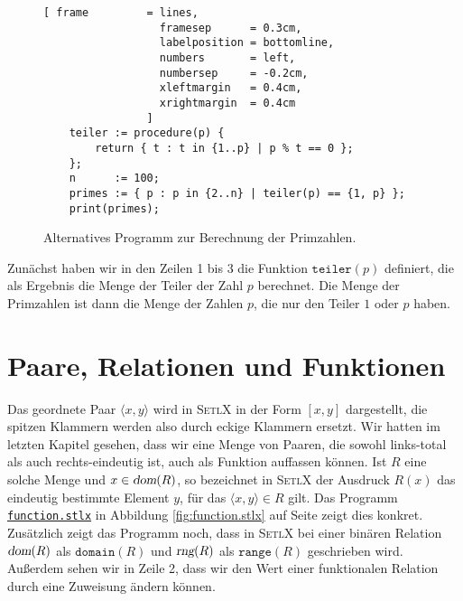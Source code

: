 \begin{figure}[!ht]
  \centering
\begin{Verbatim}[ frame         = lines, 
                  framesep      = 0.3cm, 
                  labelposition = bottomline,
                  numbers       = left,
                  numbersep     = -0.2cm,
                  xleftmargin   = 0.4cm,
                  xrightmargin  = 0.4cm
                ]
    teiler := procedure(p) {
        return { t : t in {1..p} | p % t == 0 };
    };
    n      := 100;
    primes := { p : p in {2..n} | teiler(p) == {1, p} };
    print(primes);
\end{Verbatim} 
\vspace*{-0.3cm}
\caption{Alternatives Programm zur Berechnung der Primzahlen.  \label{fig:primes-slim.stlx}}
\end{figure} %

Zunächst haben wir in den Zeilen 1 bis 3 die Funktion $\texttt{teiler}(p)$ definiert, die
als Ergebnis die Menge der Teiler der Zahl $p$ berechnet.  Die Menge der Primzahlen ist dann die
Menge der Zahlen $p$, die nur den Teiler $1$ oder $p$ haben.


\section{Paare, Relationen und Funktionen}
Das geordnete Paar $\langle x, y \rangle$ wird in \textsc{SetlX} in der Form $[x,y]$
dargestellt, die spitzen Klammern werden also durch eckige Klammern ersetzt.
Wir hatten im letzten Kapitel gesehen, dass wir eine Menge von Paaren, die
sowohl links-total als auch rechts-eindeutig ist, auch als Funktion auffassen
können.  Ist $R$ eine solche Menge und $x \in \textsl{dom}(R)$, so bezeichnet in
\textsc{SetlX} der Ausdruck $R(x)$  das eindeutig bestimmte Element $y$, für das
$\langle x, y \rangle \in R$ gilt.  Das Programm 
\href{https://github.com/karlstroetmann/Logik/blob/master/SetlX/function.stlx}{\texttt{function.stlx}}
in Abbildung
\ref{fig:function.stlx} auf Seite \pageref{fig:function.stlx} zeigt dies konkret.
Zusätzlich zeigt das Programm noch, dass in \textsc{SetlX} bei einer binären
Relation $\textsl{dom}(R)$ als $\texttt{domain}(R)$ und $\textsl{rng}(R)$ als $\mathtt{range}(R)$ geschrieben wird.
Außerdem sehen wir in Zeile 2, dass wir den Wert einer funktionalen Relation durch eine
Zuweisung ändern können.


